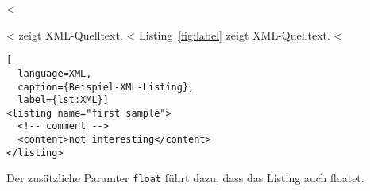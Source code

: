 <%

\begin{WSample}
<%
 zeigt XML-Quelltext.
<%
Listing~\ref{fig:label} zeigt XML-Quelltext.
<%

\begin{lstlisting}[
  language=XML,
  caption={Beispiel-XML-Listing},
  label={lst:XML}]
<listing name="first sample">
  <!-- comment -->
  <content>not interesting</content>
</listing>
\end{lstlisting}
\end{WSample}
\PexaShowBoth{}

Der zusätzliche Paramter \verb+float+ führt dazu, dass das Listing auch floatet.
